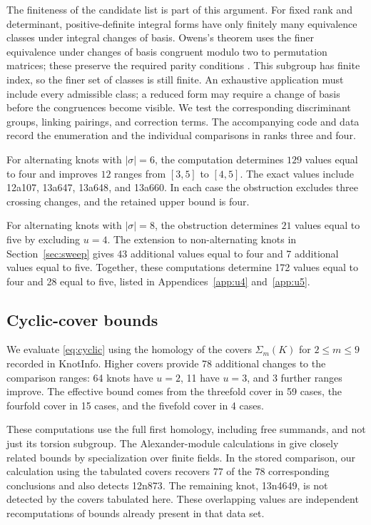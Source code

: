 \documentclass[12pt, oneside]{amsart}
\newcommand{\dbc}{\Sigma}
\newcommand{\KI}{\textsf{KnotInfo}}
\newcommand{\kn}[2]{\textup{#1#2}}
\newcommand{\nCyclicFive}{4}
\newcommand{\nCyclicFour}{15}
\newcommand{\nCyclicNew}{78}
\newcommand{\nCyclicThree}{59}
\newcommand{\nImprovedC}{3}
\newcommand{\nSweepRankFour}{7}
\newcommand{\nSweepRankThree}{43}
\newcommand{\nUfive}{28}
\newcommand{\nUfour}{172}
\newcommand{\nUthreeC}{11}
\newcommand{\nUtwoC}{64}
\begin{document}
The finiteness of the candidate list is part of this argument. For fixed rank and
determinant, positive-definite integral forms have only finitely many equivalence
classes under integral changes of basis. Owens's theorem uses the finer equivalence
under changes of basis congruent modulo two to permutation matrices; these preserve
the required parity conditions \cite[Thm.~5 and \S5]{Owens}. This subgroup has finite
index, so the finer set of classes is still finite. An exhaustive application must
include every admissible class; a reduced form may require a change of basis before
the congruences become visible. We test the corresponding
discriminant groups, linking pairings, and correction terms. The accompanying code and
data record the enumeration and the individual comparisons in ranks three and four.

For alternating knots with $|\sigma|=6$, the computation determines $129$
values equal to four and improves $12$ ranges from $[3,5]$ to $[4,5]$.
The exact values include \kn{12a}{107}, \kn{13a}{647}, \kn{13a}{648},
and \kn{13a}{660}. In each case the obstruction excludes three crossing
changes, and the retained upper bound is four.

For alternating knots with $|\sigma|=8$, the obstruction determines $21$
values equal to five by excluding $u=4$. The extension to non-alternating
knots in Section~\ref{sec:sweep} gives \nSweepRankThree{} additional values equal to four
and \nSweepRankFour{} additional values equal to five. Together, these computations
determine \nUfour{} values equal to four and \nUfive{} equal to five,
listed in Appendices~\ref{app:u4} and~\ref{app:u5}.

\subsection{Cyclic-cover bounds}\label{sec:cyclic}

We evaluate \eqref{eq:cyclic} using the homology of the covers $\dbc_m(K)$ for
$2\le m\le9$ recorded in \KI{}. Higher covers provide \nCyclicNew{} additional changes
to the comparison ranges: \nUtwoC{} knots have $u=2$, \nUthreeC{} have $u=3$, and
\nImprovedC{} further ranges improve. The effective bound comes from the threefold
cover in \nCyclicThree{} cases, the fourfold cover in \nCyclicFour{} cases, and the
fivefold cover in \nCyclicFive{} cases.

These computations use the full first homology, including free summands, and not just its
torsion subgroup. The Alexander-module calculations in \cite{DGKTdata} give closely
related bounds by specialization over finite fields. In the stored comparison, our
calculation using the tabulated covers recovers $77$ of the $78$ corresponding conclusions and
also detects \kn{12n}{873}. The remaining knot, \kn{13n}{4649}, is not detected by the
covers tabulated here. These overlapping values are independent recomputations of bounds
already present in that data set.
\end{document}
